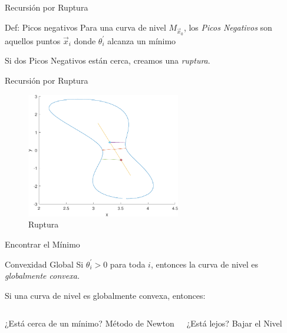 \documentclass[fleqn]{beamer}\usepackage[]{graphicx}\usepackage[]{xcolor}
\begin{document}
\begin{frame}{Recursión por Ruptura}
\begin{block}{Def: Picos negativos}
    Para una curva de nivel $M_{\vec{x}_0}$, los \emph{Picos Negativos} son aquellos puntos $\vec{x}_i$ donde $\theta^{'}_i$ alcanza un mínimo
\end{block}
    Si dos Picos Negativos están cerca, creamos una \emph{ruptura}. %
\end{frame}

\begin{frame}{Recursión por Ruptura}
    \begin{figure}
        \centering
        \includegraphics[width = 0.6\textwidth]{SiSePudo-cropped.pdf}
        \caption{Ruptura}
        \label{fig:my_label}
    \end{figure}
\end{frame}

\begin{frame}{Encontrar el Mínimo}
    \begin{block}{Convexidad Global}
        Si $\theta^{'}_i>0$ para toda $i$, entonces la curva de nivel es \emph{globalmente convexa.}
    \end{block}
    \vspace{10 pt}
        Si una curva de nivel es globalmente convexa, entonces:\\
        \vspace{10 pt}
        \begin{columns}
        \begin{block}{¿Está cerca de un mínimo?}
          Método de Newton
        \end{block}
        \begin{block}{¿Está lejos?}
         Bajar el Nivel
        \end{block}
        \end{columns}
\end{frame}
\end{document}
